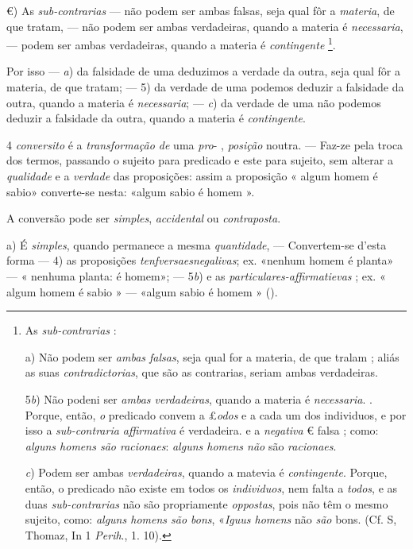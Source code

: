 €) As \emph{sub-contrarias} --- não podem ser ambas falsas, seja qual fôr a \emph{materia}, de que tratam, --- não podem ser ambas verdadeiras, quando a materia é \emph{necessaria}, --- podem ser ambas verdadeiras, quando a materia é \emph{contingente} \footnote{As \emph{sub-contrarias} :\par a) Não podem ser \emph{ambas falsas}, seja qual for a materia, de que tralam ; aliás as suas \emph{contradictorias}, que são as contrarias, seriam ambas verdadeiras.\par 5\emph{b}) Não podeni ser \emph{ambas verdadeiras}, quando a materia é \emph{necessaria}. . Porque, então, \emph{o} predicado convem a £\emph{odos} e a cada um dos individuos, e por isso a \emph{sub-contraria affirmativa} é verdadeira. e a \emph{negativa} € falsa ; como: \emph{alguns homens são racionaes}: \emph{alguns homens não} são \emph{racionaes}.\par \emph{c}) Podem ser ambas \emph{verdadeiras}, quando a matevia é \emph{contingente}. Porque, então, o predicado não existe em todos os \emph{individuos}, nem falta a \emph{todos}, e as duas \emph{sub-contrarias} não são propriamente \emph{oppostas}, pois não têm o mesmo sujeito, como: \emph{alguns homens são bons}, «\emph{Iguus homens} não \emph{são} bons. (Cf. S, Thomaz, In 1 \emph{Perih}., 1. 10).}.

Por isso --- \emph{a}) da falsidade de uma deduzimos a verdade da outra, seja qual fôr a materia, de que tratam; --- 5) da verdade de uma podemos deduzir a falsidade da outra, quando a materia é \emph{necessaria}; --- \emph{c}) da verdade de uma não podemos deduzir a falsidade da outra, quando a materia é \emph{contingente}.


4 \emph{conversito} é a \emph{transformação de} uma \emph{pro}- , \emph{posição} noutra. --- Faz-ze pela troca dos termos, passando o sujeito    para predicado e este para sujeito, sem alterar a \emph{qualidade} e a \emph{verdade} das proposições: assim a proposição « algum homem é sabio» converte-se nesta: «algum sabio é homem ».


A conversão pode ser \emph{simples}, \emph{accidental} ou \emph{contraposta}.

a) É \emph{simples}, quando permanece a mesma \emph{quantidade}, --- Convertem-se d'esta forma --- 4) as proposições \emph{tenfversaesnegalivas}; ex. «nenhum homem é planta» --- « nenhuma planta: é homem»; --- 5\emph{b}) e as \emph{particulares-affirmatievas} ; ex. « algum homem é sabio » --- «algum sabio é homem » ().

